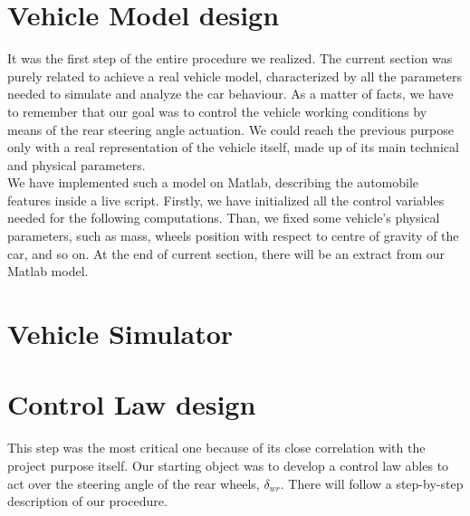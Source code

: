 \documentclass[a4paper,12pt,titlepage]{report}
\begin{document}
\section{Vehicle Model design}
	It was the first step of the entire procedure we realized. The current section was purely related to achieve a real vehicle model, characterized by all the  parameters needed to simulate and analyze the car behaviour. As a matter of facts, we have to remember that our goal was to control the vehicle working conditions by means of the rear steering angle actuation. We could reach the previous purpose only with a real representation of the vehicle itself, made up of its main technical and physical parameters.\\
	We have implemented such a model on Matlab, describing the automobile features inside a live script. Firstly, we have initialized all the control variables needed for the following computations. Than, we fixed some vehicle's physical parameters, such as mass, wheels position with respect to centre of gravity of the car, and so on. At the end of current section, there will be an extract from our Matlab model.
		\begin{figure} %
			\centering
		\end{figure}
\section{Vehicle Simulator}

\section{Control Law design}
	This step was the most critical one because of its close correlation with the project purpose itself. Our starting object was to develop a control law ables to act over the steering angle of the rear wheels, $\delta_{wr}$. There will follow a step-by-step description of our procedure.
\end{document}
